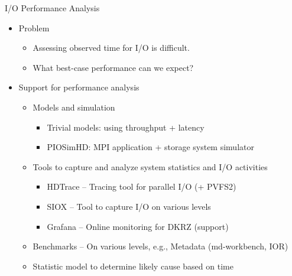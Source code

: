 \documentclass[compress,11pt,xcolor=svgnames,aspectratio=169]{beamer}
\begin{document}
\begin{frame}[fragile]{I/O Performance Analysis}

\begin{itemize}
\setlength\itemsep{0.3cm}

  \item Problem

    \begin{itemize}
    \item Assessing observed time for I/O is difficult.
    \item What best-case performance can we expect?
    \end{itemize}

  \item Support for performance analysis

    \begin{itemize}

    \item Models and simulation

      \begin{itemize}
      \item Trivial models: using throughput + latency
      \item PIOSimHD: MPI application + storage system simulator
      \end{itemize}

    \item Tools to capture and analyze system statistics and I/O activities

      \begin{itemize}
      \item HDTrace -- Tracing tool for parallel I/O (+ PVFS2)
      \item SIOX -- Tool to capture I/O on various levels
      \item Grafana -- Online monitoring for DKRZ (support)
      \end{itemize}

    \item Benchmarks -- On various levels, e.g., Metadata (md-workbench, IOR)

    \item Statistic model to determine likely cause based on time

    \end{itemize}

\end{itemize}

\end{frame}
\end{document}
